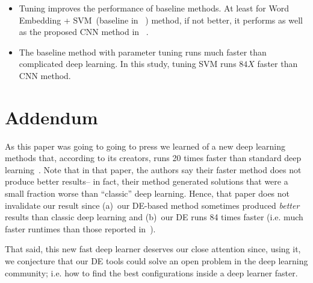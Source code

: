 \documentclass[sigconf]{acmart}
\theoremstyle{break}
\newcommand{\bi}{\begin{itemize}[leftmargin=0.4cm]}
\newcommand{\ei}{\end{itemize}}
\begin{document}
\bi
\item Tuning improves the performance of baseline methods. 
At least for Word Embedding + SVM~(baseline in ~\cite{xu2016predicting}) method, if not better,
it performs as well as the proposed CNN method in ~\cite{xu2016predicting}.
\item The baseline method with parameter tuning runs much faster than complicated deep learning.
In this study, tuning SVM runs $84X$ faster than CNN method.
\ei

\section{Addendum}
As this paper was going to going to press we learned of a new deep learning methods that, according to its
creators, runs 20 times faster than standard deep learning~\cite{spring2016scalable}. 
Note that in that paper, the authors say  their faster method does not produce better results-- 
in fact, their method generated solutions that were a small fraction worse than ``classic'' deep learning. Hence, that paper does not invalidate our result since (a)~our DE-based
method sometimes produced {\em better} results than classic deep learning and (b)~our DE runs 84 times faster (i.e. much faster runtimes than those reported in~\cite{spring2016scalable}).

That said, this new fast deep learner deserves our close attention since, using it, we conjecture that our DE tools
could solve an open problem in the deep learning community; i.e. how to find the best configurations inside a deep learner faster.

\end{document}
